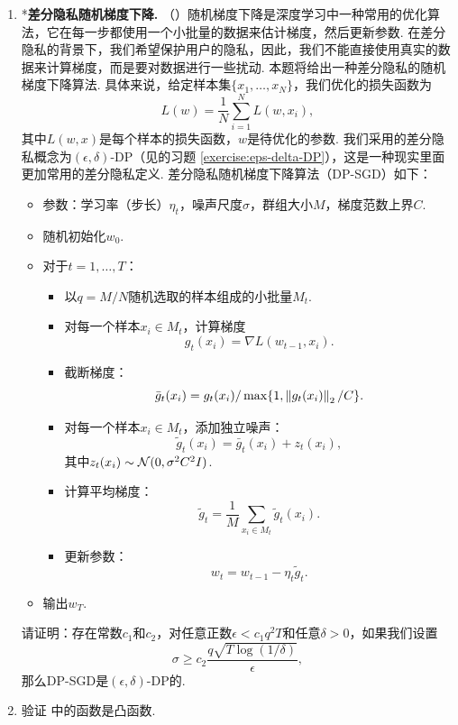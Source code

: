 \begin{enumerate}[wide, labelindent=0pt]
    \item *\textbf{差分隐私随机梯度下降. }（\cite{abadiDeepLearningDifferential2016}）随机梯度下降是深度学习中一种常用的优化算法，它在每一步都使用一个小批量的数据来估计梯度，然后更新参数. 在差分隐私的背景下，我们希望保护用户的隐私，因此，我们不能直接使用真实的数据来计算梯度，而是要对数据进行一些扰动. 本题将给出一种差分隐私的随机梯度下降算法. 具体来说，给定样本集$\{x_1,\dots,x_N\}$，我们优化的损失函数为
    \[L(w) = \frac{1}{N}\sum_{i=1}^N L(w,x_i),\]
    其中$L(w,x)$是每个样本的损失函数，$w$是待优化的参数. 
    我们采用的差分隐私概念为$(\epsilon,\delta)$-DP（见的习题 \ref{exercise:eps-delta-DP}），这是一种现实里面更加常用的差分隐私定义. 差分隐私随机梯度下降算法（DP-SGD）如下：
    \begin{itemize}
        \item 参数：学习率（步长）$\eta_t$，噪声尺度$\sigma$，群组大小$M$，梯度范数上界$C$.
        \item 随机初始化$w_0$.
        \item 对于$t=1,\dots,T$：
        \begin{itemize}
            \item 以$q=M/N$随机选取的样本组成的小批量$M_t$.
            \item 对每一个样本$x_i\in M_t$，计算梯度
            \[g_t(x_i) = \nabla L(w_{t-1},x_i).\]
            \item 截断梯度：
            \[\bar{g}_t(x_i) = g_t(x_i)/\max\{1,\left\|g_t(x_i)\right\|_2/C\}.\]
            \item 对每一个样本$x_i\in M_t$，添加独立噪声：
            \[\tilde{g}_t(x_i) = \bar{g}_t(x_i) + z_t(x_i),\]
            其中$z_t(x_i)\sim \mathcal{N}(0,\sigma^2C^2I)$.
            \item 计算平均梯度：
            \[\tilde{g}_t = \frac{1}{M}\sum_{x_i\in M_t} \tilde{g}_t(x_i).\]
            \item 更新参数：
            \[w_t = w_{t-1} - \eta_t \tilde{g}_t.\]
        \end{itemize}
        \item 输出$w_T$.
    \end{itemize}
    请证明：存在常数$c_1$和$c_2$，对任意正数$\epsilon<c_1q^2T$和任意$\delta>0$，如果我们设置
    \[\sigma \geq c_2\frac{q\sqrt{T\log(1/\delta)}}{\epsilon},\]
    那么DP-SGD是$(\epsilon,\delta)$-DP的.
    
    \item \label{exercise:convex-function} 验证 中的函数是凸函数.
    

\end{enumerate}
